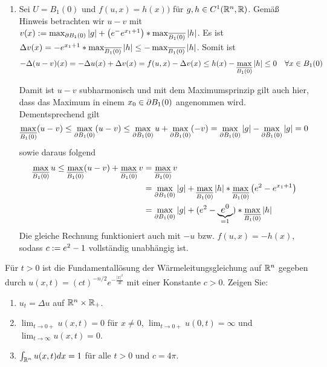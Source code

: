 \begin{exercisePage}
\begin{enumerate}[label=(zu \alph*), leftmargin=*]
		\item Sei $U = B_1(0)$ und $f(u,x) = h(x))$ für $g,h \in C^1(\mathbb{R}^n,\mathbb{R})$. Gemäß Hinweis betrachten wir $u-v$ mit $v(x) \mathrel{:=} \max_{\partial B_1(0)} \left| g \right| + \left( e^- e^{x_1 + 1} \right) * \max_{\overline{B_1(0)}} \left| h \right|$. Es ist $\Delta v(x) = -e^{x_1 + 1} * \max_{\overline{B_1(0)}} \left| h \right| \le - \max_{\overline{B_1(0)}} \left| h \right|$. Somit ist
		\begin{equation*}
			- \Delta (u-v) (x) = - \Delta u(x) + \Delta v(x) = f(u,x) - \Delta v(x) \le h(x) - \max_{\overline{B_1(0)}} \left| h \right| \le 0 \quad \forall x \in B_1(0)
		\end{equation*}
		
		Damit ist $u-v$ subharmonisch und mit dem Maximumsprinzip gilt auch hier, dass das Maximum in einem $x_0 \in \partial B_1(0)$ angenommen wird. Dementsprechend gilt
		\begin{equation*}
			\max_{\overline{B_1(0)}} (u-v) \le \max_{\partial B_1(0)} (u-v) \le \max_{\partial B_1(0)} u + \max_{\partial B_1(0)} (-v) = \max_{\partial B_1(0)} \left| g \right| - \max_{\partial B_1(0)} \left| g \right| = 0
		\end{equation*}
		sowie daraus folgend
		\begin{equation*}
			\begin{aligned}
				\max_{\overline{B_1(0)}} u 
				\le \max_{\overline{B_1(0)}}(u-v) + \max_{\overline{B_1(0)}} v 
				&= \max_{\overline{B_1(0)}} v \\
				&= \max_{\partial B_1(0)} \left| g \right| + \max_{\overline{B_1(0)}} \left| h \right| * \max_{\overline{B_1(0)}} \left( e^2 - e^{x_1 + 1} \right) \\
				&= \max_{\partial B_1(0)} \left| g \right| + \large( e^2 - \underbrace{e^0}_{=1} \large) * \max_{\overline{B_1(0)}} \left| h \right|
			\end{aligned}
		\end{equation*}
		Die gleiche Rechnung funktioniert auch mit $-u$ bzw. $f(u,x) = -h(x)$, sodass $c \mathrel{:=} e^2 - 1$ vollständig unabhängig ist.
	\end{enumerate} 
	
	
	\begin{task}
		Für $t>0$ ist die Fundamentallösung der Wärmeleitungsgleichung auf $\mathbb{R}^n$ gegeben durch $u(x,t) = (c t)^{-n/2} e^{-\frac{|x|^2}{4t}}$ mit einer Konstante $c>0$. Zeigen Sie:
		\begin{enumerate}
			\item $u_t = \Delta u$ auf $\mathbb{R}^n \times \mathbb{R}_+$.
			\item $\lim_{t\to 0+} u(x,t)= 0$ für $x\neq 0$, $\lim_{t\to 0+} u(0,t) = \infty$ und $\lim_{t\to\infty} u(x,t)=0$.
			\item $\int_{\mathbb{R}^n} u(x,t)dx = 1$ für alle $t>0$ und $c= 4\pi$.
		\end{enumerate}
	\end{task}


\end{exercisePage}
